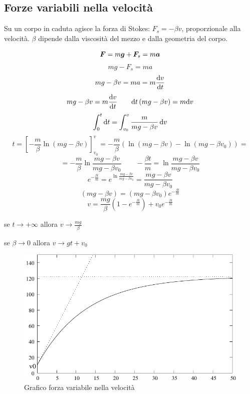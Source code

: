 \subsection{Forze variabili nella velocità}
Su un corpo in caduta agisce la forza di Stokes: $F_s=-\beta v$,
proporzionale alla velocità. $\beta$ dipende dalla viscosità del
mezzo e dalla geometria del corpo.

\begin{equation*}\boldsymbol{F}=m\boldsymbol{g}+\boldsymbol{F}_s=m\boldsymbol{a}\end{equation*}
\begin{equation*}mg-F_s=ma\end{equation*}
\begin{equation*}mg-\beta v=ma=m\frac{\mathrm{d} v}{\mathrm{d} t}\end{equation*}
\begin{equation*}mg-\beta v=m\frac{\mathrm{d} v}{\mathrm{d} t}\qquad \mathrm{d} t\left(mg-\beta v\right)=m\mathrm{d} v\end{equation*}
\begin{equation*}\int_0^t\mathrm{d} t=\int_{v_0}^v\frac{m}{mg-\beta v}\,\mathrm{d} v\end{equation*}
$$t=\left[-\frac{m}{\beta}\ln\left(mg-\beta
v\right)\right]_{v_0}^{v}=-\frac{m}{\beta}\left(\ln\left(mg-\beta
v\right)-\ln\left(mg-\beta v_0\right)\right)=$$
\begin{equation*}=-\frac{m}{\beta}\ln\frac{mg-\beta v}{mg-\beta v_0}\qquad-\frac{\beta t}{m}=\ln\frac{mg-\beta v}{mg-\beta v_0}\end{equation*}
\begin{equation*}e^{-\frac{\beta t}{m}}=e^{\ln\frac{mg-\beta v}{mg-\beta v_0}}=\frac{mg-\beta v}{mg-\beta v_0}\end{equation*}
\begin{equation*}(mg-\beta v)=(mg-\beta v_0)e^{-\frac{\beta t}{m}}\end{equation*}
$$v=\frac{mg}{\beta}\left(1-e^{-\frac{\beta
t}{m}}\right)+v_0e^{-\frac{\beta t}{m}}$$

se $t\rightarrow +\infty$ allora $v\rightarrow\frac{mg}{\beta}$

se $\beta\rightarrow 0$ allora $v\rightarrow gt+v_0$
\begin{figure}[htbp]
\centering
\includegraphics[scale=1]{immagini/fisica1/grafico_forze_nella_velocita}
\caption{Grafico forza variabile nella velocità}
\end{figure}


